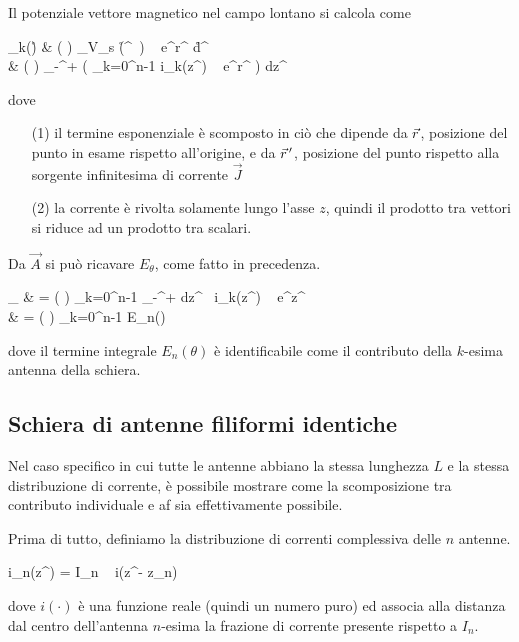 		Il potenziale vettore magnetico nel campo lontano si calcola come 
		\begin{esp}
			_k(\r) 
				&  \frac{\mu}{4\pi} 
				\left(  \right)
				\int_{V_s} (\r^{\, \prime}) 
					~ e^{\jmath \beta r^\prime \cos \theta} d\r^{\, \prime} \\
				&  \frac{\mu}{4\pi} 
				\left(  \right) \hat{z} 
				\int_{-\infty}^{+\infty} 
					\left( \sum_{k=0}^{n-1} i_k(z^\prime) ~ e^{\jmath \beta r^\prime \cos \theta} \right)
					dz^\prime
		\end{esp}
		dove 
		\begin{itemize}
			\item[(1)] il termine esponenziale è scomposto in ciò che dipende da $\vec{r}$, posizione del punto in esame rispetto all'origine, e da $\vec{r}^{\,\prime}$, posizione del punto rispetto alla sorgente infinitesima di corrente $\vec{J}$
			\item[(2)] la corrente è rivolta solamente lungo l'asse $z$, quindi il prodotto tra vettori si riduce ad un prodotto tra scalari.
		\end{itemize}
		
		Da $\vec{A}$ si può ricavare $E_\theta$, come fatto in precedenza.
		\begin{esp} \label{eq:e_theta_schiera_dipoli}
			\vec{E}_\theta
			& = \jmath \frac{\eta_o}{2\lambda} 
					\left( \frac{e^{-\jmath \beta r}}{r} \right) 
					\sum_{k=0}^{n-1} 
						\int_{-\infty}^{+\infty} dz^\prime ~ i_k(z^\prime) ~ e^{\jmath \beta z^\prime \cos \theta} ~  \\
			& = \jmath \frac{\eta_o}{2\lambda} 
					\left( \frac{e^{-\jmath \beta r}}{r} \right) 
					\sum_{k=0}^{n-1} E_n(\theta) \\
		\end{esp}
		dove il termine integrale $E_n(\theta)$ è identificabile come il contributo della $k$-esima antenna della schiera.
		
	\subsection{Schiera di antenne filiformi identiche}
		Nel caso specifico in cui tutte le antenne abbiano la stessa lunghezza $L$ e la stessa distribuzione di corrente, è possibile mostrare come la scomposizione tra contributo individuale e \gls{af} sia effettivamente possibile.
		
		Prima di tutto, definiamo la distribuzione di correnti complessiva delle $n$ antenne.
		\begin{esp}
			i_n(z^\prime) = I_n ~ i(z^\prime - z_n)
		\end{esp}
		dove $i(\cdot)$ è una funzione reale (quindi un numero puro) ed associa alla distanza dal centro dell'antenna $n$-esima la frazione di corrente presente rispetto a $I_n$.
		

